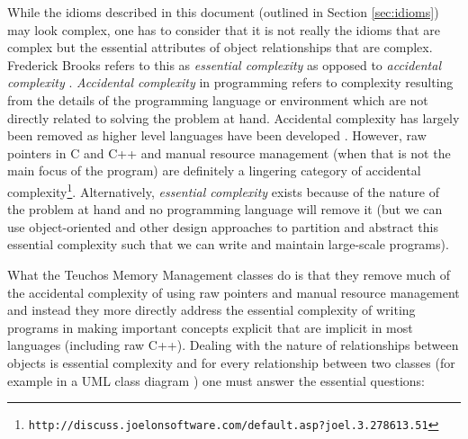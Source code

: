 \documentclass[pdf,ps2pdf,11pt]{SANDreport}
\begin{document}
While the idioms described in this document (outlined in Section
{}\ref{sec:idioms}) may look complex, one has to consider that it is
not really the idioms that are complex but the essential attributes of
object relationships that are complex.  Frederick Brooks refers to
this as {}\textit{essential complexity} as opposed to
{}\textit{accidental complexity} {}\cite{MythicalManMonth95}.
{}\textit{Accidental complexity} in programming refers to complexity
resulting from the details of the programming language or environment
which are not directly related to solving the problem at hand.
Accidental complexity has largely been removed as higher level
languages have been developed {}\cite[Chapter 16]{MythicalManMonth95}.
However, raw pointers in C and C++ and manual resource management
(when that is not the main focus of the program) are definitely a
lingering category of accidental
complexity\footnote{\texttt{http://discuss.joelonsoftware.com/default.asp?joel.3.278613.51}}.
Alternatively, {}\textit{essential complexity} exists because of the
nature of the problem at hand and no programming language will remove
it (but we can use object-oriented and other design approaches to
partition and abstract this essential complexity such that we can
write and maintain large-scale programs).

What the Teuchos Memory Management classes do is that they remove much
of the accidental complexity of using raw pointers and manual resource
management and instead they more directly address the essential
complexity of writing programs in making important concepts explicit
that are implicit in most languages (including raw C++).  Dealing with
the nature of relationships between objects is essential complexity
and for every relationship between two classes (for example in a UML
class diagram {}\cite{UMLDistilledThirdEdition04}) one must answer the
essential questions:
\end{document}
